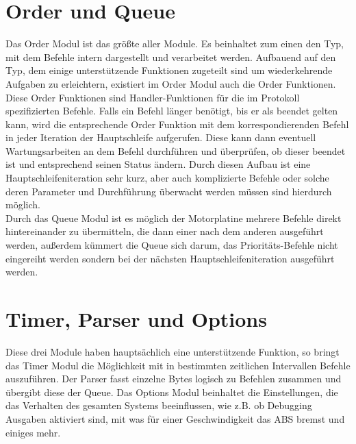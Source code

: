 \section{Order und Queue}
Das Order Modul ist das größte aller Module. Es beinhaltet zum einen den Typ, mit dem Befehle
intern dargestellt und verarbeitet werden. Aufbauend auf den Typ, dem einige unterstützende
Funktionen zugeteilt sind um wiederkehrende Aufgaben zu erleichtern, existiert im Order
Modul auch die Order Funktionen. Diese Order Funktionen sind Handler-Funktionen für die
im Protokoll spezifizierten Befehle. Falls ein Befehl länger benötigt, bis er als beendet
gelten kann, wird die entsprechende Order Funktion mit dem korrespondierenden Befehl in jeder
Iteration der Hauptschleife aufgerufen. Diese kann dann eventuell Wartungsarbeiten an dem
Befehl durchführen und überprüfen, ob dieser beendet ist und entsprechend seinen Status ändern.
Durch diesen Aufbau ist eine Hauptschleifeniteration sehr kurz, aber auch komplizierte Befehle
oder solche deren Parameter und Durchführung überwacht werden müssen sind hierdurch möglich.\\
Durch das Queue Modul ist es möglich der Motorplatine mehrere Befehle direkt hintereinander
zu übermitteln, die dann einer nach dem anderen ausgeführt werden, außerdem kümmert die
Queue sich darum, das Prioritäts-Befehle nicht eingereiht werden sondern bei der nächsten
Hauptschleifeniteration ausgeführt werden.
\section{Timer, Parser und Options}
Diese drei Module haben hauptsächlich eine unterstützende Funktion, so bringt das Timer Modul
die Möglichkeit mit in bestimmten zeitlichen Intervallen Befehle auszuführen. Der Parser
fasst einzelne Bytes logisch zu Befehlen zusammen und übergibt diese der Queue. Das Options
Modul beinhaltet die Einstellungen, die das Verhalten des gesamten Systems beeinflussen, wie
z.B. ob Debugging Ausgaben aktiviert sind, mit was für einer Geschwindigkeit das ABS bremst
und einiges mehr.

